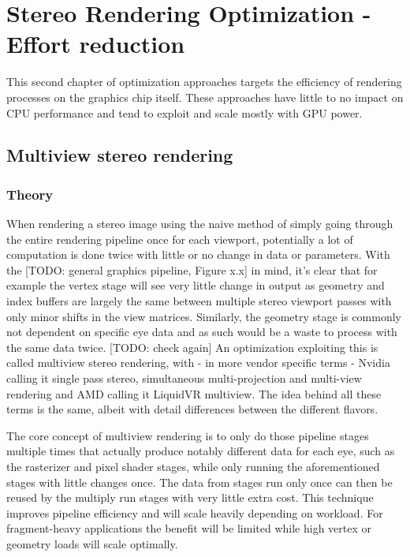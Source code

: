 
\chapter{Stereo Rendering Optimization - Effort reduction}
This second chapter of optimization approaches targets the efficiency of rendering processes on the graphics chip itself. These approaches have little to no impact on CPU performance and tend to exploit and scale mostly with GPU power. 

\section{Multiview stereo rendering}
\subsection{Theory}
When rendering a stereo image using the naive method of simply going through the entire rendering pipeline once for each viewport, potentially a lot of computation is done twice with little or no change in data or parameters. 
With the [TODO: general graphics pipeline, Figure x.x] in mind, it's clear that for example the vertex stage will see very little change in output as geometry and index buffers are largely the same between multiple stereo viewport passes with only minor shifts in the view matrices. Similarly, the geometry stage is commonly not dependent on specific eye data and as such would be a waste to process with the same data twice. [TODO: check again]
An optimization exploiting this is called multiview stereo rendering, with - in more vendor specific terms - Nvidia calling it single pass stereo, simultaneous multi-projection and multi-view rendering and AMD calling it LiquidVR multiview. The idea behind all these terms is the same, albeit with detail differences between the different flavors. 

The core concept of multiview rendering is to only do those pipeline stages multiple times that actually produce notably different data for each eye, such as the rasterizer and pixel shader stages, while only running the aforementioned stages with little changes once. The data from stages run only once can then be reused by the multiply run stages with very little extra cost. This technique improves pipeline efficiency and will scale heavily depending on workload. For fragment-heavy applications the benefit will be limited while high vertex or geometry loads will scale optimally. 

